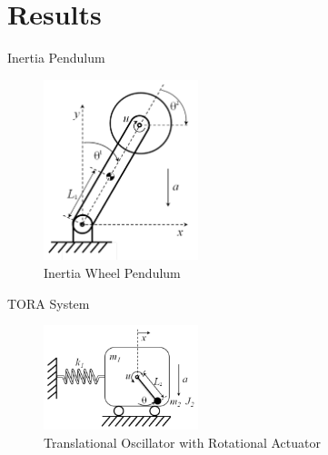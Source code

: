 \documentclass{beamer}
\begin{document}
\section{Results}

\begin{frame}{Inertia Pendulum}
  \begin{figure}
    \centering
    \includegraphics[width=0.4\textwidth]{../Figures/inertia_wheel.png}
    \caption{Inertia Wheel Pendulum}
  \end{figure}
\end{frame}

\begin{frame}{TORA System}

  \begin{figure}
    \centering
    \includegraphics[width=0.4\textwidth]{../Figures/tora.png}
    \caption{Translational Oscillator with Rotational Actuator}
  \end{figure}
  
\end{frame}
\end{document}
